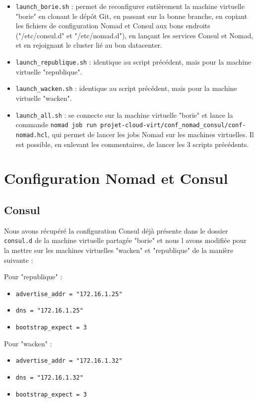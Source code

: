 \documentclass{report}
\begin{document}
\begin{itemize}
    \item \texttt{launch\_borie.sh} : permet de reconfigurer entièrement la machine virtuelle "borie" en clonant le dépôt Git, en passant sur la bonne branche, en copiant les fichiers de configuration Nomad et Consul aux bons endroits ("/etc/consul.d" et "/etc/nomad.d"), en lançant les services Consul et Nomad, et en rejoignant le cluster lié au bon datacenter.
    \item \texttt{launch\_republique.sh} : identique au script précédent, mais pour la machine virtuelle "republique".
    \item \texttt{launch\_wacken.sh} : identique au script précédent, mais pour la machine virtuelle "wacken".
    \item \texttt{launch\_all.sh} : se connecte sur la machine virtuelle "borie" et lance la commande \texttt{nomad job run projet-cloud-virt/conf\_nomad\_consul/conf-nomad.hcl}, qui permet de lancer les jobs Nomad sur les machines virtuelles. Il est possible, en enlevant les commentaires, de lancer les 3 scripts précédents.
\end{itemize}

\newpage

\chapter{Configuration Nomad et Consul}

\section{Consul}
Nous avons récupéré la configuration Consul déjà présente dans le dossier \texttt{consul.d} de la machine virtuelle partagée "borie" et nous l avons modifiée pour la mettre sur les machines virtuelles "wacken" et "republique" de la manière suivante :

Pour "republique" :
\begin{itemize}
    \item \texttt{advertise\_addr = "172.16.1.25"}
    \item \texttt{dns = "172.16.1.25"}
    \item \texttt{bootstrap\_expect = 3}
\end{itemize}

Pour "wacken" :
\begin{itemize}
    \item \texttt{advertise\_addr = "172.16.1.32"}
    \item \texttt{dns = "172.16.1.32"}
    \item \texttt{bootstrap\_expect = 3}
\end{itemize}
\end{document}
